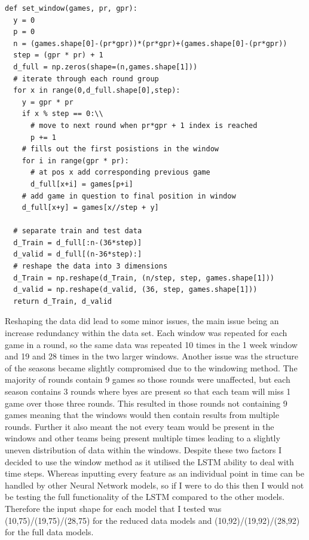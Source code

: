\documentclass{imc-inf}
\begin{document}
\begin{lstlisting}
def set_window(games, pr, gpr):
  y = 0
  p = 0
  n = (games.shape[0]-(pr*gpr))*(pr*gpr)+(games.shape[0]-(pr*gpr))
  step = (gpr * pr) + 1
  d_full = np.zeros(shape=(n,games.shape[1]))
  # iterate through each round group
  for x in range(0,d_full.shape[0],step):
    y = gpr * pr
    if x % step == 0:\\
      # move to next round when pr*gpr + 1 index is reached
	  p += 1 
    # fills out the first posistions in the window
    for i in range(gpr * pr): 
	  # at pos x add corresponding previous game
	  d_full[x+i] = games[p+i] 
	# add game in question to final position in window
    d_full[x+y] = games[x//step + y] 

  # separate train and test data
  d_Train = d_full[:n-(36*step)]
  d_valid = d_full[(n-36*step):]
  # reshape the data into 3 dimensions
  d_Train = np.reshape(d_Train, (n/step, step, games.shape[1]))
  d_valid = np.reshape(d_valid, (36, step, games.shape[1]))
  return d_Train, d_valid
\end{lstlisting}
	Reshaping the data did lead to some minor issues, the main issue being an increase redundancy within the data set. Each window was repeated for each game in a round, so the same data was repeated 10 times in the 1 week window and 19 and 28 times in the two larger windows. Another issue was the structure of the seasons became slightly compromised due to the windowing method. The majority of rounds contain 9 games so those rounds were unaffected, but each season contains 3 rounds where byes are present so that each team will miss 1 game over those three rounds. This resulted in those rounds not containing 9 games meaning that the windows would then contain results from multiple rounds. Further it also meant the not every team would be present in the windows and other teams being present multiple times leading to a slightly uneven distribution of data within the windows. Despite these two factors I decided to use the window method as it utilised the LSTM ability to deal with time steps. Whereas inputting every feature as an individual point in time can be handled by other Neural Network models, so if I were to do this then I would not be testing the full functionality of the LSTM compared to the other models. Therefore the input shape for each model that I tested was (10,75)/(19,75)/(28,75) for the reduced data models and (10,92)/(19,92)/(28,92) for the full data models.
	\newline
	
\end{document}
